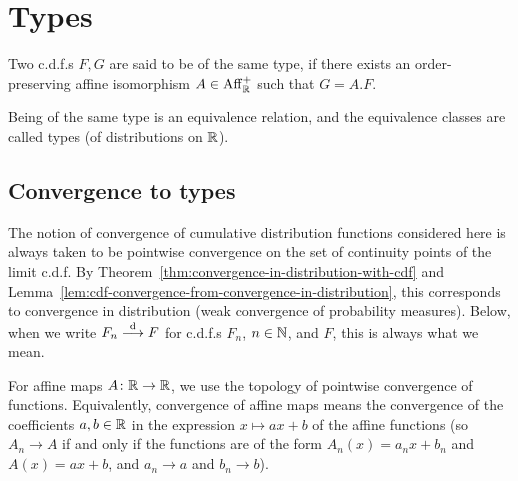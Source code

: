 \chapter{Types}

\begin{definition}
  \label{def:cdf-type}
  Two c.d.f.s $F, G$ are said to be of the same type, if
  there exists an order-preserving affine isomorphism $A \in \mathrm{Aff}^+_{\mathbb{R}}$
  such that $G = A . F$.

  Being of the same type is an equivalence relation, and
  the equivalence classes are called types (of distributions on $\mathbb{R}$).
\end{definition}


\section{Convergence to types}

The notion of convergence of cumulative distribution functions
considered here is always taken to be pointwise convergence
on the set of continuity points of the limit c.d.f.
By Theorem~\ref{thm:convergence-in-distribution-with-cdf} and
Lemma~\ref{lem:cdf-convergence-from-convergence-in-distribution},
this corresponds to convergence in distribution (weak convergence
of probability measures). Below, when we write $F_n \overset{\mathrm{d}}{\longrightarrow} F$
for c.d.f.s $F_n$, $n \in \mathbb{N}$, and $F$, this is always what we
mean.

For affine maps $A \colon \mathbb{R} \to \mathbb{R}$, we use the topology
of pointwise convergence of functions. Equivalently, convergence of affine maps
means the convergence of the coefficients $a, b \in \mathbb{R}$ in the expression
$x \mapsto a x + b$ of the affine functions
(so $A_n \to A$ if and only if the functions are of the form
$A_n(x) = a_n x + b_n$ and $A(x) = a x + b$, and $a_n \to a$ and $b_n \to b$).

